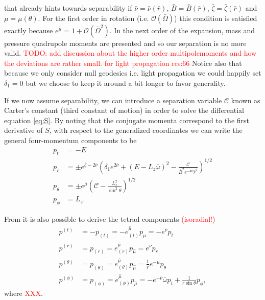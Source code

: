 \documentclass[iop, usenatbib]{emulateapj}
\makeatletter
\def\fvec#1{\underline{\sbox\tw@{$#1$}\dp\tw@\z@\box\tw@}}
\newcommand{\red}[1]{\textcolor{red}{#1}}
\newcommand{\pd}{\ensuremath{\partial}} %
\newcommand{\Ca}{\ensuremath{\mathcal{C}}}
\newcommand{\rb}{\ensuremath{\bar{r}}}
\newcommand{\wb}{\ensuremath{\bar{\omega}}}
\newcommand{\Ob}{\ensuremath{\bar{\Omega}}}
\newcommand{\nub}{\ensuremath{\bar{\nu}}}
\newcommand{\zetab}{\ensuremath{\bar{\zeta}}}
\newcommand{\Bb}{\ensuremath{\bar{B}}}
\newcommand{\mub}{\ensuremath{\bar{\mu}}}
\makeatother
\begin{document}
that already hints towards separability if $\nub = \nub(\rb)$, $\Bb = \Bb(\rb)$, $\zetab = \zetab(\rb)$ and $\mu = \mu(\theta)$.
For the first order in rotation (i.e. $\mathcal{O}(\Ob)$) this condition is satisfied exactly because $e^{\mub} = 1 + \mathcal{O}(\Ob^2)$.
In the next order of the expansion, mass and pressure quadrupole moments are presented and so our separation is no more valid.
\red{TODO: add discussion about the higher order multipolemoments and how the deviations are rather small. for light propagation}
\red{rcs:66}
Notice also that because we only consider null geodesics i.e. light propagation we could happily set $\delta_1 = 0$ but we choose to keep it around a bit longer to favor generality.

If we now assume separability, we can introduce a separation variable $\Ca$ known as Carter's constant (third constant of motion) in order to solve the differential equation \eqref{eq:S}.
By noting that the conjugate momenta correspond to the first derivative of $S$, with respect to the generalized coordinates we can write the general four-momentum \fvec{p} components to be
\begin{align}
  p_t       &= -E \\
  p_{\rb}    &= \pm e^{\zetab - 2\nub} \left( \delta_1 e^{2\nub} + (E - L_z \wb)^2 - \frac{\Ca}{\Bb^2 e^{-4\nub} \rb^2} \right)^{1/2}\\
  p_{\theta} &= \pm e^{\mub} \left( \Ca - \frac{L_z^2}{\sin^2\theta} \right)^{1/2}\\
  p_{\phi}   &= L_z.
\end{align}

From \fvec{p} it is also possible to derive the tetrad components \red{(isoradial!)}
\begin{align}
  p^{(t)} &= -p_{(t)} = -e_{(t)}^{\hat{\mu}} p_{\hat{\mu}} = -e^{\nub}p_t \label{eq:tetp_t}\\
  p^{(r)} &= p_{(r)} = e_{(r)}^{\hat{\mu}} p_{\hat{\mu}} = e^{\nub} p_r \label{eq:tetp_r}\\
  p^{(\theta)} &= p_{(\theta)} = e_{(\theta)}^{\hat{\mu}} p_{\hat{\mu}} = \frac{1}{r} e^{-\mu} p_{\theta} \label{eq:tetp_theta}\\
  p^{(\phi)} &= p_{(\phi)} = e_{(\phi)}^{\hat{\mu}} p_{\hat{\mu}} = -e^{-\nub} \wb p_t + \frac{1}{r \sin\theta} p_{\phi} \label{eq:tetp_phi},
\end{align}
where \red{XXX}.
\end{document}

